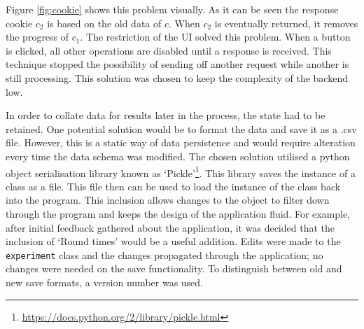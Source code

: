 Figure \ref{fig:cookie} shows this problem visually. As it can be seen the response cookie $c_2$ is based on the old data of $c$. When $c_2$ is eventually returned, it removes the progress of $c_1$. The restriction of the UI solved this problem. When a button is clicked, all other operations are disabled until a response is received. This technique stopped the possibility of sending off another request while another is still processing. This solution was chosen to keep the complexity of the backend low.

In order to collate data for results later in the process, the state had to be retained. One potential solution would be to format the data and save it as a .csv file. However, this is a static way of data persistence and would require alteration every time the data schema was modified. The chosen solution utilised a python object serialisation library known as `Pickle'\footnote{\url{https://docs.python.org/2/library/pickle.html}}. This library saves the instance of a class as a file. This file then can be used to load the instance of the class back into the program. This inclusion allows changes to the object to filter down through the program and keeps the design of the application fluid. For example, after initial feedback gathered about the application, it was decided that the inclusion of `Round times' would be a useful addition. Edits were made to the \verb|experiment| class and the changes propagated through the application; no changes were needed on the save functionality. To distinguish between old and new save formats, a version number was used.